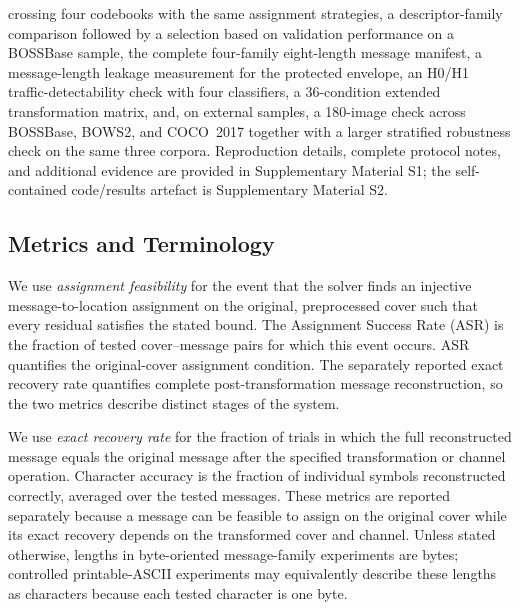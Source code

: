 \documentclass[preprint,12pt]{elsarticle}
\theoremstyle{plain}
\providecommand{\DIFaddtex}[1]{{\protect\color{blue} \sf #1}} %
\providecommand{\DIFdeltex}[1]{{\protect\color{red} \scriptsize #1}} %
\providecommand{\DIFaddbegin}{} %
\providecommand{\DIFaddend}{} %
\providecommand{\DIFdelbegin}{} %
\providecommand{\DIFdelend}{} %
\providecommand{\DIFadd}[1]{\texorpdfstring{\DIFaddtex{#1}}{#1}} %
\providecommand{\DIFdel}[1]{\texorpdfstring{\DIFdeltex{#1}}{}} %
\providecommand{\DIFscaledelfig}{0.5}
\newlength{\DIFdelgraphicswidth} %
\newlength{\DIFdelgraphicsheight} %
\providecommand{\DIFaddincludegraphics}[2][]{{\color{blue}\fbox{\DIFOincludegraphics[#1]{#2}}}} %
\providecommand{\DIFdelincludegraphics}[2][]{%
\sbox{\DIFdelgraphicsbox}{\DIFOincludegraphics[#1]{#2}}%
\settoboxwidth{\DIFdelgraphicswidth}{\DIFdelgraphicsbox} %
\settoboxtotalheight{\DIFdelgraphicsheight}{\DIFdelgraphicsbox} %
\scalebox{\DIFscaledelfig}{%
\parbox[b]{\DIFdelgraphicswidth}{\usebox{\DIFdelgraphicsbox}\\[-\baselineskip] \rule{\DIFdelgraphicswidth}{0em}}\llap{\resizebox{\DIFdelgraphicswidth}{\DIFdelgraphicsheight}{%
\setlength{\unitlength}{\DIFdelgraphicswidth}%
\begin{picture}(1,1)%
\thicklines\linethickness{2pt} %
{\color[rgb]{1,0,0}\put(0,0){\framebox(1,1){}}}%
{\color[rgb]{1,0,0}\put(0,0){\line( 1,1){1}}}%
{\color[rgb]{1,0,0}\put(0,1){\line(1,-1){1}}}%
\end{picture}%
}\hspace*{3pt}}} %
} %
\DeclareRobustCommand{\DIFaddbegin}{\DIFOaddbegin \let\includegraphics\DIFaddincludegraphics} %
\DeclareRobustCommand{\DIFaddend}{\DIFOaddend \let\includegraphics\DIFOincludegraphics} %
\DeclareRobustCommand{\DIFdelbegin}{\DIFOdelbegin \let\includegraphics\DIFdelincludegraphics} %
\DeclareRobustCommand{\DIFdelend}{\DIFOaddend \let\includegraphics\DIFOincludegraphics} %
\renewcommand{\DIFdel}[1]{}
\renewcommand{\DIFdelincludegraphics}[2][]{}
\begin{document}
crossing four codebooks with the same assignment strategies, a
descriptor-family comparison followed by a \DIFdelbegin \DIFdel{validation-gated selection on }\DIFdelend \DIFaddbegin \DIFadd{selection based on validation performance on }\DIFaddend a
BOSSBase sample, the complete four-family eight-length message manifest, a
message-length leakage measurement for the protected envelope, an
H0/H1 traffic-detectability check with four classifiers, a 36-condition
extended transformation matrix, and, on external samples, a 180-image check
across BOSSBase, BOWS2, and COCO~2017 together with a larger stratified
robustness check on the same three corpora. Reproduction details, complete protocol notes, and additional evidence are provided in Supplementary Material S1; the self-contained code/results artefact is Supplementary Material S2.

\subsection{Metrics and Terminology}
\label{sec:metrics}

We use \emph{assignment feasibility} for the event that the solver finds an
injective message-to-location assignment on the original, preprocessed cover
such that every residual satisfies the stated bound. The Assignment Success
Rate (ASR) is the fraction of tested cover--message pairs for which this event
occurs. ASR quantifies the original-cover assignment condition. The separately
reported exact recovery rate quantifies complete post-transformation message
reconstruction, so the two metrics describe distinct stages of the system.

We use \emph{exact recovery rate} for the fraction of trials in which the full
reconstructed message equals the original message after the specified
transformation or channel operation. Character accuracy is the fraction of
individual symbols reconstructed correctly, averaged over the tested
messages. These metrics are reported separately because a message can be
feasible to assign on the original cover while its exact recovery depends on
the transformed cover and channel. Unless stated otherwise, lengths in byte-oriented message-family
experiments are bytes; controlled printable-ASCII experiments may equivalently
describe these lengths as characters because each tested character is one
byte.
\end{document}
